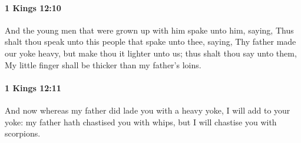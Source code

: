 		\paragraph{1 Kings 12:10} %
			\label{1KINGS-12-10}

			And the young men that were grown up with him spake unto him, saying, Thus shalt thou speak unto this people that spake unto thee, saying, Thy father made our yoke heavy, but make thou it lighter unto us; thus shalt thou say unto them, My little finger shall be thicker than my father’s loins.


		\paragraph{1 Kings 12:11} %
			\label{1KINGS-12-11}

			And now whereas my father did lade you with a heavy yoke, I will add to your yoke: my father hath chastised you with whips, but I will chastise you with scorpions.

